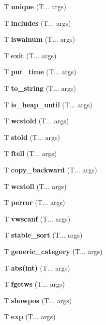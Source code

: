 \begin{DoxyCompactItemize}
\item 
\mbox{\label{unique}} 
T \textbf{ unique} (T... args)
\item 
\mbox{\label{includes}} 
T \textbf{ includes} (T... args)
\item 
\mbox{\label{iswalnum}} 
T \textbf{ iswalnum} (T... args)
\item 
\mbox{\label{exit}} 
T \textbf{ exit} (T... args)
\item 
\mbox{\label{put_time}} 
T \textbf{ put\+\_\+time} (T... args)
\item 
\mbox{\label{to_string}} 
T \textbf{ to\+\_\+string} (T... args)
\item 
\mbox{\label{is_heap_until}} 
T \textbf{ is\+\_\+heap\+\_\+until} (T... args)
\item 
\mbox{\label{wcstof}} 
T \textbf{ wcstold} (T... args)
\item 
\mbox{\label{stof}} 
T \textbf{ stold} (T... args)
\item 
\mbox{\label{ftell}} 
T \textbf{ ftell} (T... args)
\item 
\mbox{\label{copy_backward}} 
T \textbf{ copy\+\_\+backward} (T... args)
\item 
\mbox{\label{wcstol}} 
T \textbf{ wcstoll} (T... args)
\item 
\mbox{\label{perror}} 
T \textbf{ perror} (T... args)
\item 
\mbox{\label{vfwscanf}} 
T \textbf{ vwscanf} (T... args)
\item 
\mbox{\label{stable_sort}} 
T \textbf{ stable\+\_\+sort} (T... args)
\item 
\mbox{\label{generic_category}} 
T \textbf{ generic\+\_\+category} (T... args)
\item 
\mbox{\label{abs}} 
T \textbf{ abs(int)} (T... args)
\item 
\mbox{\label{fgetws}} 
T \textbf{ fgetws} (T... args)
\item 
\mbox{\label{showpos}} 
T \textbf{ showpos} (T... args)
\item 
\mbox{\label{exp}} 
T \textbf{ exp} (T... args)
\item 
\mbox{\label{fill}} 

\end{DoxyCompactItemize}
